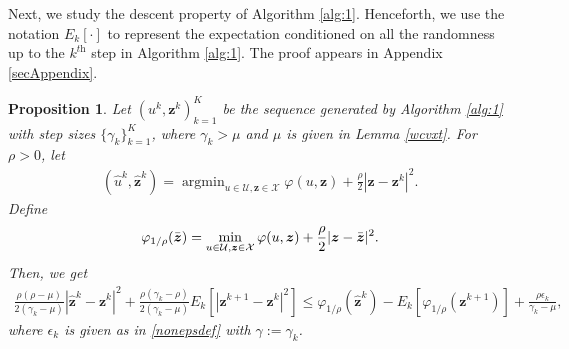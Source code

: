 \documentclass[10pt,reqno]{amsart}
\newcommand{\argmin}{\operatorname{argmin}}
\newcommand{\1}{{\chi}}
\def\leq{\leqslant}
\numberwithin{equation}{section}
\theoremstyle{thmlemcorr}
\numberwithin{theorem}{section}
\theoremstyle{thmlemcorr*}
\theoremstyle{defi}
\theoremstyle{remexample}
\newtheorem{pro}[theorem]{Proposition}
\theoremstyle{ass}
\begin{document}
Next, we study the descent property of Algorithm \ref{alg:1}. Henceforth, we use the notation $E_k[\cdot]$ to represent the expectation conditioned on all the randomness up to the $k^{\textit{th}}$ step in Algorithm \ref{alg:1}. The proof appears in Appendix \ref{secAppendix}. 
\begin{pro}
	\label{pronlmid}
	Let $(u^k, \boldsymbol{z}^k)_{k=1}^K$ be the sequence generated by Algorithm \ref{alg:1} with step sizes $\{\gamma_k\}_{k=1}^K$, where $\gamma_k>\mu$ and $\mu$ is  given in Lemma \ref{wcvxt}. 
	For $\rho>0$, let 
	\begin{align}
		\label{nluhzh}
		(\hat{u}^k, \hat{\boldsymbol{z}}^k)=\argmin_{u\in \mathcal{U}, \boldsymbol{z}\in \mathcal{X}}{\varphi(u, \boldsymbol{z})}+\frac{\rho}{2}|\boldsymbol{z}-\boldsymbol{z}^k|^2.
	\end{align}
	Define
	\begin{align}
		\label{nlprxvhgm}
		\varphi_{1/\rho}(\Bar{\boldsymbol{z}})=\min_{u\in \mathcal{U}, \boldsymbol{z}\in \mathcal{X}}\varphi(u, \boldsymbol{z}) + \frac{\rho}{2}|\boldsymbol{z} - \bar{\boldsymbol{z}}|^2. 
	\end{align}
	Then, we get
	\begin{align}
		\label{nllteq}
		\frac{\rho(\rho-\mu)}{2(\gamma_k - \mu)}|\hat{\boldsymbol{z}}^k - \boldsymbol{z}^k|^2 + \frac{\rho(\gamma_k - \rho)}{2(\gamma_k - \mu)}E_k[|\boldsymbol{z}^{k+1} - \boldsymbol{z}^k|^2]
		\leq \varphi_{1/\rho}( \hat{\boldsymbol{z}}^k) - E_k[\varphi_{1/\rho}(\boldsymbol{z}^{k+1})] + \frac{\rho\epsilon_k}{\gamma_k - \mu},
	\end{align}
	where $\epsilon_k$ is given as in \eqref{nonepsdef} with $\gamma:=\gamma_k$. 
\end{pro}
\end{document}
